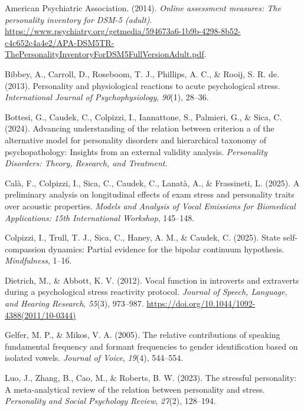 \documentclass[
  english,
  man]{apa6}
\newlength{\cslhangindent}
\newenvironment{CSLReferences}[2] %
 {\begin{list}{}{%
  \setlength{\itemindent}{0pt}
  \setlength{\leftmargin}{0pt}
  \setlength{\parsep}{0pt}
  \ifodd #1
   \setlength{\leftmargin}{\cslhangindent}
   \setlength{\itemindent}{-1\cslhangindent}
  \fi
  \setlength{\itemsep}{#2\baselineskip}}}
 {\end{list}}
\begin{document}
\label{refs}
\begin{CSLReferences}{1}{0}
American Psychiatric Association. (2014). \emph{Online assessment measures: The personality inventory for DSM-5 (adult)}. \url{https://www.psychiatry.org/getmedia/594673a6-1b9b-4298-8b52-c4c652c4a4e2/APA-DSM5TR-ThePersonalityInventoryForDSM5FullVersionAdult.pdf}.

Bibbey, A., Carroll, D., Roseboom, T. J., Phillips, A. C., \& Rooij, S. R. de. (2013). Personality and physiological reactions to acute psychological stress. \emph{International Journal of Psychophysiology}, \emph{90}(1), 28--36.

Bottesi, G., Caudek, C., Colpizzi, I., Iannattone, S., Palmieri, G., \& Sica, C. (2024). Advancing understanding of the relation between criterion a of the alternative model for personality disorders and hierarchical taxonomy of psychopathology: Insights from an external validity analysis. \emph{Personality Disorders: Theory, Research, and Treatment}.

Calà, F., Colpizzi, I., Sica, C., Caudek, C., Lanatà, A., \& Frassineti, L. (2025). A preliminary analysis on longitudinal effects of exam stress and personality traits over acoustic properties. \emph{Models and Analysis of Vocal Emissions for Biomedical Applications: 15th International Workshop}, 145--148.

Colpizzi, I., Trull, T. J., Sica, C., Haney, A. M., \& Caudek, C. (2025). State self-compassion dynamics: Partial evidence for the bipolar continuum hypothesis. \emph{Mindfulness}, 1--16.

Dietrich, M., \& Abbott, K. V. (2012). Vocal function in introverts and extraverts during a psychological stress reactivity protocol. \emph{Journal of Speech, Language, and Hearing Research}, \emph{55}(3), 973--987. \url{https://doi.org/10.1044/1092-4388(2011/10-0344)}

Gelfer, M. P., \& Mikos, V. A. (2005). The relative contributions of speaking fundamental frequency and formant frequencies to gender identification based on isolated vowels. \emph{Journal of Voice}, \emph{19}(4), 544--554.

Luo, J., Zhang, B., Cao, M., \& Roberts, B. W. (2023). The stressful personality: A meta-analytical review of the relation between personality and stress. \emph{Personality and Social Psychology Review}, \emph{27}(2), 128--194.


\end{CSLReferences}
\end{document}
